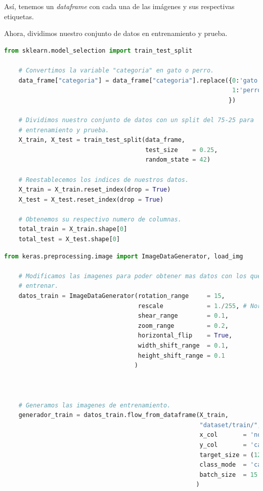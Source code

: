 \documentclass[letterpaper,11pt]{article}
\begin{document}
\begin{enumerate}
    \newpage
    Así, tenemos un \textit{dataframe} con cada una de las imágenes y sus 
    respectivas etiquetas.

    Ahora, dividimos nuestro conjunto de datos en entrenamiento y prueba.
    \begin{lstlisting}[language=Python]
    from sklearn.model_selection import train_test_split

    # Convertimos la variable "categoria" en gato o perro.
    data_frame["categoria"] = data_frame["categoria"].replace({0:'gato', 
                                                               1:'perro'
                                                              })

    # Dividimos nuestro conjunto de datos con un split del 75-25 para 
    # entrenamiento y prueba.
    X_train, X_test = train_test_split(data_frame, 
                                       test_size    = 0.25, 
                                       random_state = 42)

    # Reestablecemos los indices de nuestros datos.
    X_train = X_train.reset_index(drop = True)
    X_test = X_test.reset_index(drop = True)

    # Obtenemos su respectivo numero de columnas. 
    total_train = X_train.shape[0]
    total_test = X_test.shape[0]
    \end{lstlisting}

    \begin{lstlisting}[language=Python]
    from keras.preprocessing.image import ImageDataGenerator, load_img

    # Modificamos las imagenes para poder obtener mas datos con los que 
    # entrenar.
    datos_train = ImageDataGenerator(rotation_range     = 15,
                                     rescale            = 1./255, # Normalizamos.
                                     shear_range        = 0.1,
                                     zoom_range         = 0.2,
                                     horizontal_flip    = True,
                                     width_shift_range  = 0.1,
                                     height_shift_range = 0.1
                                    )



    # Generamos las imagenes de entrenamiento.
    generador_train = datos_train.flow_from_dataframe(X_train,
                                                      "dataset/train/",
                                                      x_col       = 'nombre',
                                                      y_col       = 'categoria',
                                                      target_size = (128, 128),
                                                      class_mode  = 'categorical',
                                                      batch_size  = 15
                                                     )


\end{lstlisting}
\end{enumerate}
\end{document}
